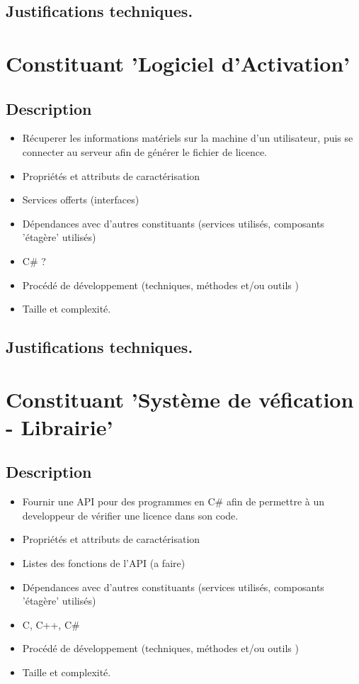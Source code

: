 \subsection{Justifications techniques.}

\section{Constituant 'Logiciel d'Activation'}
\subsection{Description}
\begin{itemize}
	\item Récuperer les informations matériels sur la machine d'un utilisateur, puis 
				se connecter au serveur afin de générer le fichier de licence.
	\item Propriétés et attributs de caractérisation
	\item Services offerts (interfaces)
	\item Dépendances avec d’autres constituants (services utilisés, composants 'étagère' utilisés)
	\item C\# ?
	\item Procédé de développement (techniques, méthodes et/ou outils )
	\item Taille et complexité.
\end{itemize}
\subsection{Justifications techniques.}

\section{Constituant 'Système de véfication - Librairie'}
\subsection{Description}
\begin{itemize}
	\item Fournir une API pour des programmes en C\# afin de 
				permettre à un developpeur de vérifier une licence dans son code.
	\item Propriétés et attributs de caractérisation
	\item Listes des fonctions de l'API (a faire)
	\item Dépendances avec d’autres constituants (services utilisés, composants 'étagère' utilisés)
	\item C, C++, C\#
	\item Procédé de développement (techniques, méthodes et/ou outils )
	\item Taille et complexité.
\end{itemize}
